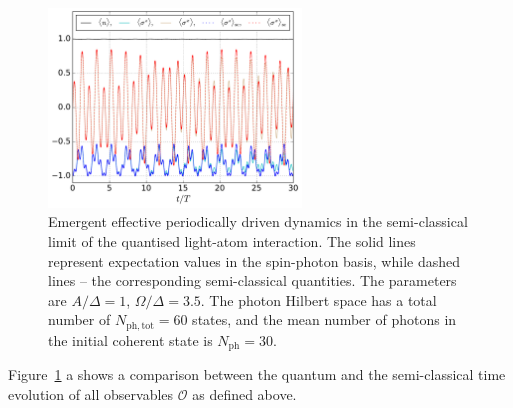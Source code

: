\documentclass{SciPost}
\newcommand\0{\scalebox{-1}[1]{0}}
\begin{document}
\begin{figure}
	\centering
	\includegraphics[width=0.6\textwidth]{example3.pdf}
	\caption{Emergent effective periodically driven dynamics in the semi-classical limit of the quantised light-atom interaction. The solid lines represent expectation values in the spin-photon basis, while dashed lines -- the corresponding semi-classical quantities. The parameters are $A/\Delta=1$, $\Omega/\Delta=3.5$. The photon Hilbert space has a total number of $N_\mathrm{ph, tot}=60$ states, and the mean number of photons in the initial coherent state is $N_\mathrm{ph}=30$.}
	\label{fig:example3}
\end{figure}

Figure~\ref{fig:example3} a shows a comparison between the quantum and the semi-classical time evolution of all observables $\mathcal{O}$ as defined above. 
\end{document}
